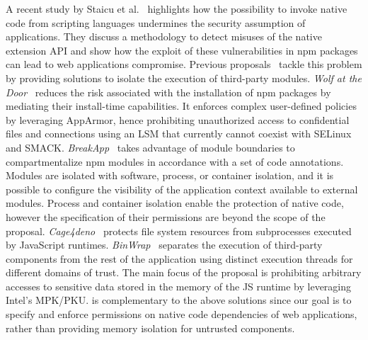 A recent study by Staicu et al.~\cite{staicu2021bilingual} highlights
how the possibility to invoke native code from scripting languages
undermines the security assumption of applications. They discuss a
methodology to detect misuses of the native extension API and show how
the exploit of these vulnerabilities in npm packages can lead to web
applications compromise. Previous proposals~\cite{
  vasilakis2018breakapp, wyss2022wolf, binwrap} tackle this problem by
providing solutions to isolate the execution of third-party
modules. {\em Wolf at the Door}~\cite{wyss2022wolf} reduces the risk
associated with the installation of npm packages by mediating their
install-time capabilities. It enforces complex user-defined policies
by leveraging AppArmor, hence prohibiting unauthorized access to
confidential files and connections using an LSM that currently cannot
coexist with SELinux and SMACK. {\em BreakApp}~\cite{
  vasilakis2018breakapp} takes advantage of module boundaries to
compartmentalize npm modules in accordance with a set of code
annotations. Modules are isolated with software, process, or container
isolation, and it is possible to configure the visibility of the
application context available to external modules. Process and
container isolation enable the protection of native code, however the
specification of their permissions are beyond the scope of the
proposal.
{\em Cage4deno}~\cite{cage4deno} protects file system resources from subprocesses
executed by JavaScript runtimes.
{\em BinWrap}~\cite{binwrap} separates the execution of
third-party components from the rest of the application using distinct
execution threads for different domains of trust. The main focus
of the proposal is prohibiting arbitrary accesses to sensitive data
stored in the memory of the JS runtime by leveraging Intel's MPK/PKU.
\natisand is complementary to the above solutions since our goal
is to specify and enforce permissions on native code dependencies of
web applications, rather than providing memory isolation for
untrusted components.

